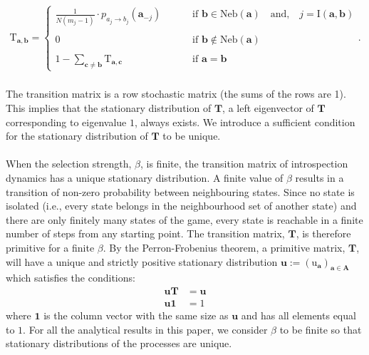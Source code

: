 \documentclass[11pt]{article}
\theoremstyle{plainCl1}
\newtheorem{Prop}{Proposition}
\theoremstyle{plainCl2}
\newcommand{\A}{\mathbf{A}}
\newcommand{\abf}{\mathbf{a}}
\newcommand{\bbf}{\mathbf{b}}
\newcommand{\cbf}{\mathbf{c}}
\newcommand{\T}{\mathbf{T}}
\newcommand{\ubf}{\mathbf{u}}
\begin{document}
\begin{align}
\mathrm{T}_{\abf, \bbf} = 
\begin{cases}
\frac{1}{N(m_j-1)}  \cdot p_{a_{j} \to b_{j}} (\abf_{-j}) \quad  \quad &\text{ if }\bbf \in \mathrm{Neb}(\abf) \quad \text{and,} \quad j = \mathrm{I}(\abf,\bbf)\\ \\ 
0 \quad &\text{ if } \bbf \notin \mathrm{Neb}(\abf) \\ \\
1 - \sum_{\cbf \neq \bbf} \mathrm{T}_{\abf,\cbf} \quad &\text{ if } \abf = \bbf
\end{cases}.
\label{Eq:transition-matrix}
\end{align} \\ 
\noindent The transition matrix is a row stochastic matrix (the sums of the rows are 1). This implies that the stationary distribution of $\T$, a left eigenvector of $\T$ corresponding to eigenvalue $1$, always exists. We introduce a sufficient condition for the stationary distribution of $\T$ to be unique. 
\\ \\
\noindent When the selection strength, $\beta$, is finite, the transition matrix of introspection dynamics has a unique stationary distribution. A finite value of $\beta$ results in a transition of non-zero probability between neighbouring states. Since no state is isolated (i.e., every state belongs in the neighbourhood set of another state) and there are only finitely many states of the game, every state is reachable in a finite number of steps from any starting point. The transition matrix, $\T$, is therefore primitive for a finite $\beta$. By the Perron-Frobenius theorem, a primitive matrix, $\T$, will have a unique and strictly positive stationary distribution $\ubf := (\mathrm{u}_\abf)_{\abf \in \A}$ which satisfies the conditions: 
\begin{eqnarray}
\label{Eq:lefteigenvector}
\ubf \T &= \ubf \\ 
\label{Eq:normalizationcondition}
\ubf \mathbf{1} &= 1
\end{eqnarray}
\noindent where $\mathbf{1}$ is the column vector with the same size as $\ubf$ and has all elements equal to $1$. For all the analytical results in this paper, we consider $\beta$ to be finite so that stationary distributions of the processes are unique. \\ \\
\end{document}

